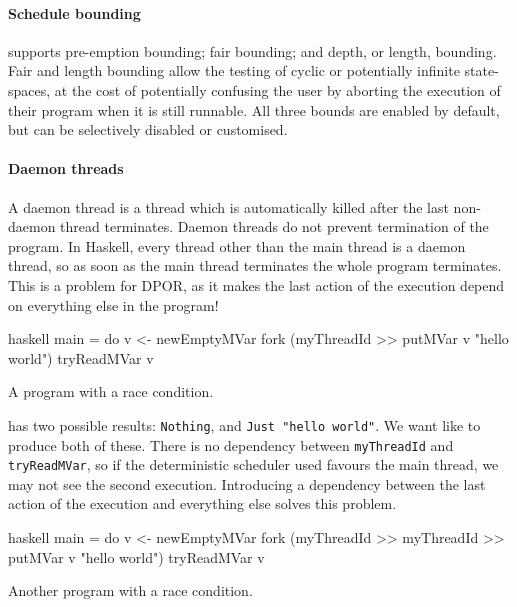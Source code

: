 \paragraph{Schedule bounding}
\dejafu{} supports pre-emption bounding\cite{musuvathi2007}; fair
bounding\cite{musuvathi2008}; and depth, or length,
bounding\cite{russell2002}.  Fair and length bounding allow the
testing of cyclic or potentially infinite state-spaces, at the cost of
potentially confusing the user by aborting the execution of their
program when it is still runnable.  All three bounds are enabled by
default, but can be selectively disabled or customised.

\paragraph{Daemon threads}
A daemon thread is a thread which is automatically killed after the
last non-daemon thread terminates.  Daemon threads do not prevent
termination of the program.  In Haskell, every thread other than the
main thread is a daemon thread, so as soon as the main thread
terminates the whole program terminates.  This is a problem for DPOR,
as it makes the last action of the execution depend on everything else
in the program!

\begin{listing}
\centering
\begin{cminted}{haskell}
main = do
  v <- newEmptyMVar
  fork (myThreadId >> putMVar v "hello world")
  tryReadMVar v
\end{cminted}
\caption{A program with a race condition.}\label{lst:daemon1}
\end{listing}

 has two possible results: \verb|Nothing|, and
\verb|Just "hello world"|.  We want like \dejafu{} to produce both of
these.  There is no dependency between \verb|myThreadId| and
\verb|tryReadMVar|, so if the deterministic scheduler used favours the
main thread, we may not see the second execution.  Introducing a
dependency between the last action of the execution and everything
else solves this problem.

\begin{listing}
\centering
\begin{cminted}{haskell}
main = do
  v <- newEmptyMVar
  fork (myThreadId >> myThreadId >> putMVar v "hello world")
  tryReadMVar v
\end{cminted}
\caption{Another program with a race condition.}\label{lst:daemon2}
\end{listing}

